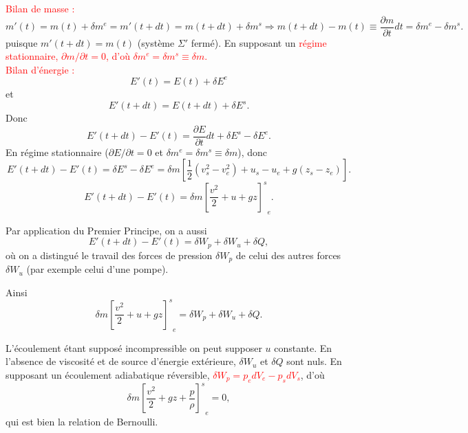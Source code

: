 \documentclass[11pt,a4paper]{report}
\begin{document}
\textcolor{red}{Bilan de masse :}
\begin{equation}
	m'(t) = m(t) + \delta m^e = m'(t+dt) = m(t+dt) + \delta m^s \Rightarrow m(t+dt) - m(t) \equiv \frac{\partial m}{\partial t}dt = \delta m^e - \delta m^s.
\end{equation}
puisque $m'(t+dt) = m(t)$ (système $\Sigma'$ fermé). 
En supposant un \textcolor{red}{régime stationnaire, $\partial m/\partial t = 0$, d'où $\delta m^e = \delta m^s \equiv \delta m$.}\\

\textcolor{red}{Bilan d'énergie :}
\begin{equation}
	E'(t) = E(t) + \delta E^e
\end{equation}
et 
\begin{equation}
    E'(t+dt) =  E(t+dt) + \delta E^s.
\end{equation}
Donc
\begin{equation}
	E'(t+dt) - E'(t) = \frac{\partial E}{\partial t}dt + \delta E^s - \delta E^e.
\end{equation}
En régime stationnaire ($\partial E/\partial t = 0$ et $\delta m^e = \delta m^s \equiv \delta m$), donc
\begin{equation}
	E'(t+dt) - E'(t) = \delta E^s - \delta E^e = \delta m \left[\frac{1}{2}\left(v_s^2 - v_e^2\right) + u_s - u_e + g\left(z_s - z_e\right)\right].
\end{equation}
\begin{equation}
	E'(t+dt) - E'(t) = \delta m {\left[\frac{v^2}{2} + u + gz\right]^s}_e.
\end{equation}

Par application du Premier Principe, on a aussi
\begin{equation}
	E'(t+dt) - E'(t) = \delta W_p + \delta W_u + \delta Q,
\end{equation}
où on a distingué le travail des forces de pression $\delta W_p$ de celui des autres forces $\delta W_u$ (par exemple celui d'une pompe).

Ainsi
\begin{equation}
	\delta m {\left[\frac{v^2}{2} + u + gz\right]^s}_e = \delta W_p + \delta W_u + \delta Q.
\end{equation}

L'écoulement étant supposé incompressible on peut supposer $u$ constante. En l'absence de viscosité et de source d'énergie extérieure, $\delta W_u$ et $\delta Q$ sont nuls.
En supposant un écoulement adiabatique réversible, \textcolor{red}{$\delta W_p = p_e dV_e - p_s dV_s$}, d'où
\begin{equation}
	\delta m {\left[\frac{v^2}{2} + gz + \frac{p}{\rho}\right]^s}_e = 0,
\end{equation}
qui est bien la relation de Bernoulli.
\end{document}
